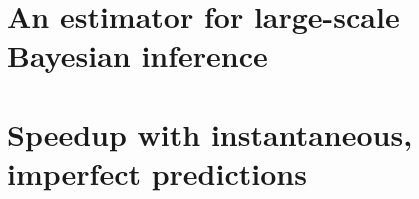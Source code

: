 \documentclass[angelino.tex]{subfiles}
\begin{document}
%
%
%
%
%
%
%
%

\section{An estimator for large-scale Bayesian inference}
\label{sec:estimator}



\section{Speedup with instantaneous, imperfect predictions}

\end{document}
